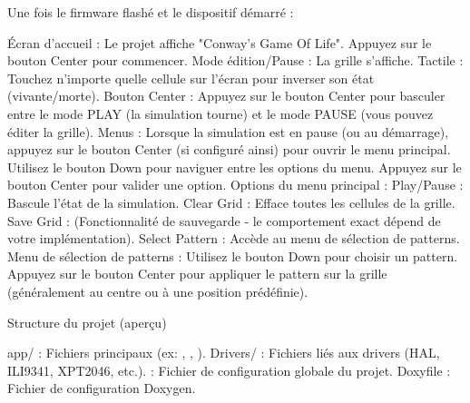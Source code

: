 Une fois le firmware flashé et le dispositif démarré \+: \begin{DoxyVerb}Écran d'accueil : Le projet affiche "Conway's Game Of Life". Appuyez sur le bouton Center pour commencer.
Mode édition/Pause : La grille s'affiche.
    Tactile : Touchez n'importe quelle cellule sur l'écran pour inverser son état (vivante/morte).
    Bouton Center : Appuyez sur le bouton Center pour basculer entre le mode PLAY (la simulation tourne) et le mode PAUSE (vous pouvez éditer la grille).
Menus :
    Lorsque la simulation est en pause (ou au démarrage), appuyez sur le bouton Center (si configuré ainsi) pour ouvrir le menu principal.
    Utilisez le bouton Down pour naviguer entre les options du menu.
    Appuyez sur le bouton Center pour valider une option.
    Options du menu principal :
        Play/Pause : Bascule l'état de la simulation.
        Clear Grid : Efface toutes les cellules de la grille.
        Save Grid : (Fonctionnalité de sauvegarde - le comportement exact dépend de votre implémentation).
        Select Pattern : Accède au menu de sélection de patterns.
    Menu de sélection de patterns :
        Utilisez le bouton Down pour choisir un pattern.
        Appuyez sur le bouton Center pour appliquer le pattern sur la grille (généralement au centre ou à une position prédéfinie).
\end{DoxyVerb}

\begin{DoxyEnumerate}
\item Structure du projet (aperçu)

app/ \+: Fichiers principaux (ex\+: , , ). Drivers/ \+: Fichiers liés aux drivers (HAL, ILI9341, XPT2046, etc.).  \+: Fichier de configuration globale du projet. Doxyfile \+: Fichier de configuration Doxygen. 
\end{DoxyEnumerate}